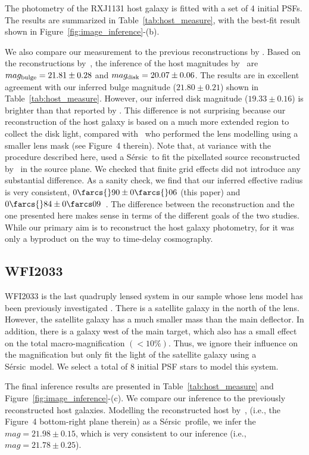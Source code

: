 \documentclass[fleqn,usenatbib]{mnras}
\newcommand{\sersic}{S\'ersic}
\begin{document}
{The photometry of the RXJ1131 host galaxy is fitted with a set of 4 initial PSFs. The results are summarized in Table~\ref{tab:host_measure}, with the best-fit result shown in Figure~\ref{fig:image_inference}-(b).

We also compare our measurement to the previous reconstructions by \citet{Ding2017b}. Based on the reconstructions by~\citet{Suyu2013}, the inference of the host magnitudes by~\citet{Ding2017b} are $mag_{\rm bulge} = 21.81 \pm 0.28$ and $mag_{\rm disk} = 20.07\pm0.06$. The results are in excellent agreement with our inferred bulge magnitude ($21.80\pm0.21$)   shown in Table~\ref{tab:host_measure}. However, our inferred disk magnitude ($19.33\pm0.16$) is brighter than that reported by \citet{Ding2017b}. This difference is not surprising because our reconstruction of the host galaxy is based on a much more extended region to collect the disk light, compared with~\citet{Suyu2013} who performed the lens modelling using a smaller lens mask (see Figure~4 therein). Note that, at variance with the procedure described here, \citet{Ding2017b} used a \sersic\ to fit the pixellated source reconstructed by~\citet{Suyu2013} in the source plane. We checked that finite grid effects did not introduce any substantial difference. As a sanity check, we find that our inferred effective radius is very consistent, $0\farcs{}90 \pm 0\farcs{}06$ (this paper) and $0\farcs{}84 \pm 0\farcs09$~\citep{Ding2017b}. The difference between the \citet{Suyu2013} reconstruction and the one presented here makes sense in terms of the different goals of the two studies. While our primary aim is to reconstruct the host galaxy photometry, for \citet{Suyu2013} it was only a byproduct on the way to time-delay cosmography.

\subsection{WFI2033}
WFI2033 is the last quadruply lensed system in our sample whose lens model has been previously investigated \citep{Rusu2019}. There is a satellite galaxy in the north of the lens. However, the satellite galaxy has a much smaller mass than the main deflector. In addition, there is a galaxy west of the main target, which also has a small effect on the total macro-magnification $(<10\%)$. Thus, we ignore their influence on the magnification but only fit the light of the satellite galaxy using a \sersic\ model. 
We select a total of 8 initial PSF stars to model this system.

The final inference results are presented in Table~\ref{tab:host_measure} and Figure~\ref{fig:image_inference}-(c). We compare our inference to the previously reconstructed host galaxies. Modelling the reconstructed host by~\citet{Rusu2019}, (i.e., the Figure~4 bottom-right plane therein) as a \sersic\ profile, we infer the $mag = 21.98 \pm 0.15$, which is very consistent to our inference (i.e., $mag = 21.78 \pm 0.25$).

}
\end{document}
